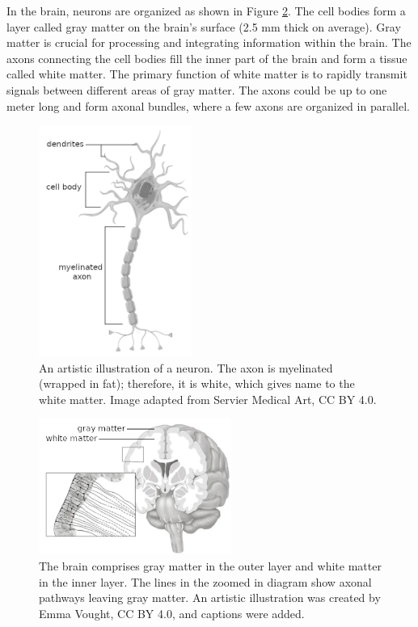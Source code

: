 In the brain, neurons are organized as shown in Figure \ref{fig:brain_matter_illustration}. The cell bodies form a layer called gray matter on the brain's surface (2.5 mm thick on average). Gray matter is crucial for processing and integrating information within the brain. The axons connecting the cell bodies fill the inner part of the brain and form a tissue called white matter. The primary function of white matter is to rapidly transmit signals between different areas of gray matter. The axons could be up to one meter long and form axonal bundles, where a few axons are organized in parallel. \cite{bear_neuroscience_2016}

\begin{figure}
  \begin{center}
    \includegraphics[width=5cm]{images/brain/neurone_II.png}
  \end{center}
  \caption[An artistic illustration of a neuron]{An artistic illustration of a neuron. The axon is myelinated (wrapped in fat); therefore, it is white, which gives name to the white matter. Image adapted from Servier Medical Art, CC BY 4.0.}
  \label{fig:neuron_illustration}
\end{figure}

\begin{figure}
  \begin{center}
    \includegraphics[width=6.3cm]{images/brain/brain_matter_illustration_II.png}
  \end{center}
  \caption[An artistic illustration of gray and white matter]{The brain comprises gray matter in the outer layer and white matter in the inner layer. The lines in the zoomed in diagram show axonal pathways leaving gray matter. An artistic illustration was created by Emma Vought, CC BY 4.0, and captions were added. \cite{bonilha_gray_2015}}
  \label{fig:brain_matter_illustration}
\end{figure}

